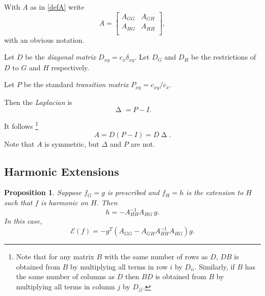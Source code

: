 \documentclass[a4paper]{amsart}
\theoremstyle{plain}
\newtheorem{proposition}[theorem]{Proposition}
\theoremstyle{definition}
\theoremstyle{remark}
\DeclareMathOperator{\lap}{\Delta}
\begin{document}
With $ A $ as in \eqref{defA} write 
\begin{equation} \label{}
A=  \begin{bmatrix} %
       A_{GG} & A_{GH} \\
      A_{HG} & A_{HH} \\
   \end{bmatrix},
\end{equation} 
with an obvious notation.

\medskip
Let $ D$ be the \emph{diagonal matrix} $ D_{xy}   = c_x  \delta_{xy} $.  Let $ D_G $ and $ D_H $ be the restrictions of $D  $ to $ G $ and $ H $ respectively. 

Let $ P $ be the standard \emph{transition matrix} $ P_{xy} = c_{xy}/c_x $.

Then the \emph{Laplacian} is 
\begin{equation} \label{lapp}
\boxed{ \lap = P-I  .}
\end{equation} 

It follows%
\footnote{Note that for any matrix $ B $ with the same number of rows as $ D $, $  DB $ is obtained from $ B $ by multiplying all terms in row $ i $ by $ D_{ii} $.  Similarly, if  $ B $ has the same number of columns as $ D $ then  $  BD $ is obtained from $ B $ by multiplying all terms in column $ j $ by $ D_{jj} $.}
\begin{equation} \label{APQ}
\boxed{ A =   D(P-I)=   D \lap .}
\end{equation} 
Note that $ A $ is symmetric, but $ \Delta $ and $ P $ are not.






\subsection{Harmonic Extensions}   
\begin{proposition}
Suppose $ f_G = g $ is prescribed and $ f_H = h $ is the extension to $ H $ such that $ f $ is harmonic on $ H $.
Then
 \begin{equation} \label{harm} 
\boxed{ h= -A_{HH}^{-1} A_{HG}\, g.}
  \end{equation}
  In this case,
 \begin{equation} \label{trMa}
\boxed{ \mathcal{E}(f) = -g^T(A_{GG} - A_{GH} A_{HH}^{-1} A_{HG})g. }
\end{equation}
 \end{proposition} 
\end{document}
